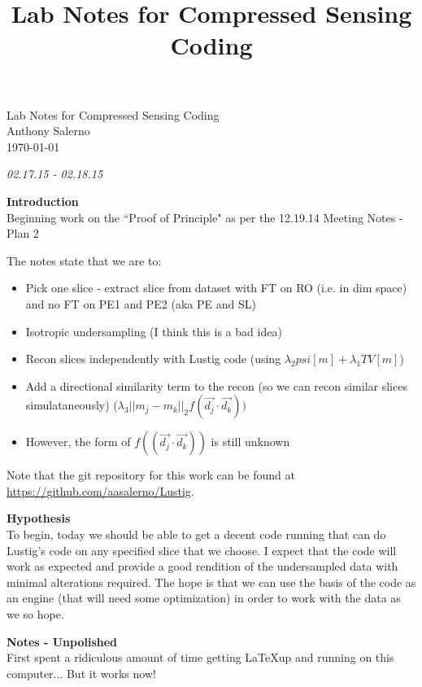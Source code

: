\documentclass[pra,11 pt]{revtex4-1}
\title{Lab Notes for Compressed Sensing Coding}
\newcommand{\bo}{\noindent\textbf}
\begin{document}
\vfill

  \begin{titlepage}
    \vspace*{\fill}
    \begin{center}
      {\huge {Lab Notes for Compressed Sensing Coding}}\\[0.5cm]
      {\large {Anthony Salerno}}\\[0.4cm]
      \today
    \end{center}
    \vspace*{\fill}
  \end{titlepage}

\clearpage
\newpage

\noindent \emph{02.17.15 - 02.18.15}

\bo{Introduction}\\
Beginning work on the ``Proof of Principle" as per the 12.19.14 Meeting Notes - Plan 2

The notes state that we are to:
\begin{itemize}
  \item Pick one slice - extract slice from dataset with FT on RO (i.e. in dim space) and no FT on PE1 and PE2 (aka PE and SL)
  \item Isotropic undersampling (I think this is a bad idea)
  \item Recon slices independently with Lustig code (using $\lambda_2 psi[m] + \lambda_1 TV[m]$)
  \item Add a directional similarity term to the recon (so we can recon similar slices simulataneously) ($\lambda_3 ||m_j - m_k||_2 f(\vec{d_j} \cdot \vec{d_k}))$
  \item However, the form of $f((\vec{d_j}\cdot \vec{d_k}))$ is still unknown
\end{itemize}

\noindent Note that the git repository for this work can be found at \url{https://github.com/aasalerno/Lustig}.


\bo{Hypothesis}\\
To begin, today we should be able to get a decent code running that can do Lustig's code on any specified slice that we choose. I expect that the code will work as expected and provide a good rendition of the undersampled data with minimal alterations required. The hope is that we can use the basis of the code as an engine (that will need some optimization) in order to work with the data as we so hope.


\bo{Notes - Unpolished}\\
First spent a ridiculous amount of time getting \LaTeX up and running on this computer... But it works now! 
\end{document}
